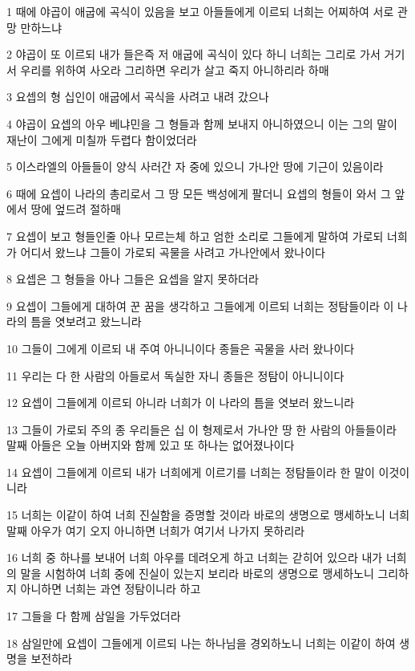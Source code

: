 \par 1 때에 야곱이 애굽에 곡식이 있음을 보고 아들들에게 이르되 너희는 어찌하여 서로 관망 만하느냐
\par 2 야곱이 또 이르되 내가 들은즉 저 애굽에 곡식이 있다 하니 너희는 그리로 가서 거기서 우리를 위하여 사오라 그리하면 우리가 살고 죽지 아니하리라 하매
\par 3 요셉의 형 십인이 애굽에서 곡식을 사려고 내려 갔으나
\par 4 야곱이 요셉의 아우 베냐민을 그 형들과 함께 보내지 아니하였으니 이는 그의 말이 재난이 그에게 미칠까 두렵다 함이었더라
\par 5 이스라엘의 아들들이 양식 사러간 자 중에 있으니 가나안 땅에 기근이 있음이라
\par 6 때에 요셉이 나라의 총리로서 그 땅 모든 백성에게 팔더니 요셉의 형들이 와서 그 앞에서 땅에 엎드려 절하매
\par 7 요셉이 보고 형들인줄 아나 모르는체 하고 엄한 소리로 그들에게 말하여 가로되 너희가 어디서 왔느냐 그들이 가로되 곡물을 사려고 가나안에서 왔나이다
\par 8 요셉은 그 형들을 아나 그들은 요셉을 알지 못하더라
\par 9 요셉이 그들에게 대하여 꾼 꿈을 생각하고 그들에게 이르되 너희는 정탐들이라 이 나라의 틈을 엿보려고 왔느니라
\par 10 그들이 그에게 이르되 내 주여 아니니이다 종들은 곡물을 사러 왔나이다
\par 11 우리는 다 한 사람의 아들로서 독실한 자니 종들은 정탐이 아니니이다
\par 12 요셉이 그들에게 이르되 아니라 너희가 이 나라의 틈을 엿보러 왔느니라
\par 13 그들이 가로되 주의 종 우리들은 십 이 형제로서 가나안 땅 한 사람의 아들들이라 말째 아들은 오늘 아버지와 함께 있고 또 하나는 없어졌나이다
\par 14 요셉이 그들에게 이르되 내가 너희에게 이르기를 너희는 정탐들이라 한 말이 이것이니라
\par 15 너희는 이같이 하여 너희 진실함을 증명할 것이라 바로의 생명으로 맹세하노니 너희 말째 아우가 여기 오지 아니하면 너희가 여기서 나가지 못하리라
\par 16 너희 중 하나를 보내어 너희 아우를 데려오게 하고 너희는 갇히어 있으라 내가 너희의 말을 시험하여 너희 중에 진실이 있는지 보리라 바로의 생명으로 맹세하노니 그리하지 아니하면 너희는 과연 정탐이니라 하고
\par 17 그들을 다 함께 삼일을 가두었더라
\par 18 삼일만에 요셉이 그들에게 이르되 나는 하나님을 경외하노니 너희는 이같이 하여 생명을 보전하라
